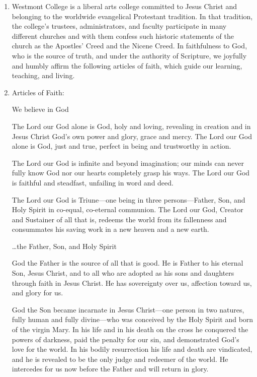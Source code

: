 					\begin{enumerate}[label=\alph*)]
						\item{Westmont College is a liberal arts college committed to Jesus Christ and belonging to the worldwide evangelical Protestant tradition.  In that tradition, the college's trustees, administrators, and faculty participate in many different churches and with them confess such historic statements of the church as the Apostles' Creed and the Nicene Creed. In faithfulness to God, who is the source of truth, and under the authority of Scripture, we joyfully and humbly affirm the following articles of faith, which guide our learning, teaching, and living.}
						\item{Articles of Faith:}

						\quad We believe in God

						\quad The Lord our God alone is God, holy and loving, revealing in creation and in Jesus Christ God's own power and glory, grace and mercy. The Lord our God alone is God, just and true, perfect in being and trustworthy in action.

						\quad The Lord our God is infinite and beyond imagination; our minds can never fully know God nor our hearts completely grasp his ways. The Lord our God is faithful and steadfast, unfailing in word and deed.

						\quad The Lord our God is Triune---one being in three persons---Father, Son, and Holy Spirit in co-equal, co-eternal communion. The Lord our God, Creator and Sustainer of all that is, redeems the world from its fallenness and consummates his saving work in a new heaven and a new earth.

						\quad \dots the Father, Son, and Holy Spirit

						\quad God the Father is the source of all that is good. He is Father to his eternal Son, Jesus Christ, and to all who are adopted as his sons and daughters through faith in Jesus Christ. He has sovereignty over us, affection toward us, and glory for us.

						\quad God the Son became incarnate in Jesus Christ---one person in two natures, fully human and fully divine---who was conceived by the Holy Spirit and born of the virgin Mary. In his life and in his death on the cross he conquered the powers of darkness, paid the penalty for our sin, and demonstrated God's love for the world.  In his bodily resurrection his life and death are vindicated, and he is revealed to be the only judge and redeemer of the world. He intercedes for us now before the Father and will return in glory.


\end{enumerate}
